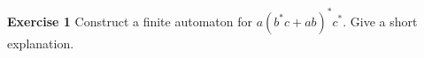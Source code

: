 \documentclass{article}
\begin{document}
\textbf{Exercise 1} Construct a finite automaton for $a(b^*c+ab)^*c^*$. Give a short explanation.
\end{document}
